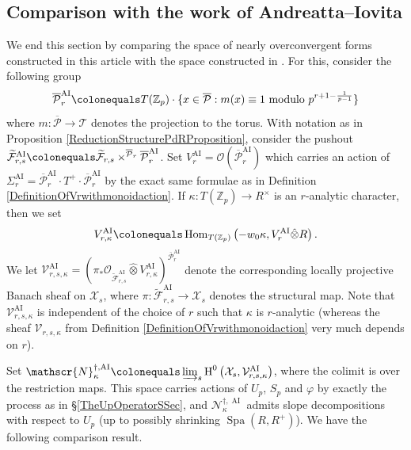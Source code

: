 \documentclass[10pt, oneside]{amsart}
\newcommand{\defeq}{\colonequals}
\renewcommand{\tilde}{\widetilde}
\numberwithin{equation}{subsection}
\theoremstyle{definition}
\theoremstyle{remark}
\newcommand{\mbb}[1]{\mathbb{#1}}
\newcommand{\hatot}{\hat{\otimes}}
\newcommand{\opn}[1]{\operatorname{#1}}
\begin{document}
\subsection{Comparison with the work of Andreatta--Iovita}

We end this section by comparing the space of nearly overconvergent forms constructed in this article with the space constructed in \cite{AI_LLL}. For this, consider the following group
\[
\overline{\mathcal{P}}_r^{\opn{AI}} \defeq T(\mbb{Z}_p) \cdot \{ x \in \overline{\mathcal{P}} : m(x) \equiv 1 \text{ modulo } p^{r+1-\frac{1}{p-1}} \}
\]
where $m \colon \overline{\mathcal{P}} \to \mathcal{T}$ denotes the projection to the torus. With notation as in Proposition \ref{ReductionStructurePdRProposition}, consider the pushout $\tilde{\mathcal{F}}_{r, s}^{\opn{AI}} \defeq \tilde{\mathcal{F}}_{r, s} \times^{\overline{\mathcal{P}}_r} \overline{\mathcal{P}}_r^{\opn{AI}}$. Set $V_r^{\opn{AI}} = \mathcal{O}(\overline{\mathcal{P}}_r^{\opn{AI}})$ which carries an action of $\Sigma_r^{\opn{AI}} = \overline{\mathcal{P}}_r^{\opn{AI}} \cdot T^+ \cdot \overline{\mathcal{P}}_r^{\opn{AI}}$ by the exact same formulae as in Definition \ref{DefinitionOfVrwithmonoidaction}. If $\kappa \colon T(\mbb{Z}_p) \to R^{\times}$ is an $r$-analytic character, then we set 
\[
V_{r, \kappa}^{\opn{AI}} \defeq \opn{Hom}_{T(\mbb{Z}_p)}\left( - w_0\kappa, V_r^{\opn{AI}} \hatot R \right) .
\]
We let $\mathcal{V}_{r, s, \kappa}^{\opn{AI}} = \left( \pi_* \mathcal{O}_{\tilde{\mathcal{F}}_{r, s}^{\opn{AI}}} \hatot V_{r, \kappa}^{\opn{AI}} \right)^{\overline{\mathcal{P}}_r^{\opn{AI}}}$ denote the corresponding locally projective Banach sheaf on $\mathcal{X}_s$, where $\pi \colon \tilde{\mathcal{F}}_{r, s}^{\opn{AI}} \to \mathcal{X}_s$ denotes the structural map. Note that $\mathcal{V}_{r, s, \kappa}^{\opn{AI}}$ is independent of the choice of $r$ such that $\kappa$ is $r$-analytic (whereas the sheaf $\mathcal{V}_{r, s, \kappa}$ from Definition \ref{DefinitionOfVrwithmonoidaction} very much depends on $r$). 

Set $\mathscr{N}^{\dagger,\opn{AI}}_{\kappa} \defeq \varinjlim_s \opn{H}^0\left( \mathcal{X}_s, \mathcal{V}_{r, s, \kappa}^{\opn{AI}} \right)$, where the colimit is over the restriction maps. This space carries actions of $U_p$, $S_p$ and $\varphi$ by exactly the process as in \S \ref{TheUpOperatorSSec}, and $\mathscr{N}^{\dagger, \opn{AI}}_{\kappa}$ admits slope decompositions with respect to $U_p$ (up to possibly shrinking $\opn{Spa}(R, R^+)$). We have the following comparison result.
\end{document}
